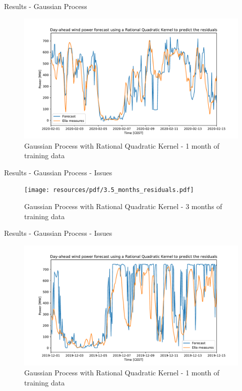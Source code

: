 \documentclass[12pt]{beamer}
\begin{document}
\begin{frame}{Results - Gaussian Process}
    \begin{figure}
        \centering
        \includegraphics[width=\textwidth]{resources/pdf/dawpf_rqk_r_2a.pdf}
        \caption{Gaussian Process with Rational Quadratic Kernel - 1 month of training data}
    \end{figure}
\end{frame}

\begin{frame}{Results - Gaussian Process - Issues}
    \begin{figure}
        \centering
        \texttt{[image: resources/pdf/3.5\_months\_residuals.pdf]}
        \caption{Gaussian Process with Rational Quadratic Kernel - 3 months of training data}
    \end{figure}
\end{frame}

\begin{frame}{Results - Gaussian Process - Issues}
    \begin{figure}
        \centering
        \includegraphics[width=\textwidth]{resources/pdf/idem_sooner_r.pdf}
        \caption{Gaussian Process with Rational Quadratic Kernel - 1 month of training data}
    \end{figure}
\end{frame}
\end{document}
